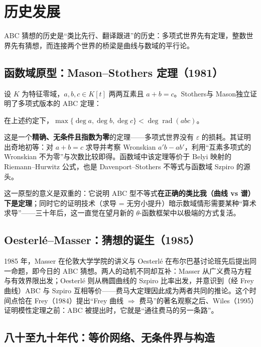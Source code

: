 \section{历史发展}\label{sec:history}

ABC 猜想的历史是“类比先行、翻译跟进”的历史：多项式世界先有定理，整数世界先有猜想，而连接两个世界的桥梁是曲线与数域的平行论。

\subsection{函数域原型：Mason--Stothers 定理（1981）}

设 $K$ 为特征零域，$a, b, c \in K[t]$ 两两互素且 $a + b = c$。Stothers\cite{stothers1981}与 Mason\cite{mason1984}独立证明了多项式版本的 ABC 定理：

\begin{theorem}\label{thm:mason}
    在上述约定下，$\max\{\deg a, \deg b, \deg c\} < \deg \operatorname{rad}(abc)$。
\end{theorem}

这是一个\textbf{精确、无条件且指数为零}的定理——多项式世界没有 $\varepsilon$ 的损耗。其证明出奇地初等：对 $a + b = c$ 求导并考察 Wronskian $a'b - ab'$，利用“互素多项式的 Wronskian 不为零”与次数比较即得。函数域中该定理等价于 Belyi 映射的 Riemann--Hurwitz 公式，也是 Davenport--Stothers 不等式与函数域 Szpiro 的源头。

这一原型的意义是双重的：它说明 ABC 型不等式\textbf{在正确的类比我（曲线 vs 谱）下是定理}；同时它的证明技术（求导 = 无穷小提升）暗示数域情形需要某种“算术求导”——三十年后，这一直觉在望月新的 $\theta$-函数框架中以极端的方式复活。

\subsection{Oesterl\'e--Masser：猜想的诞生（1985）}

1985 年，Masser 在伦敦大学学院的讲义\cite{masser1985}与 Oesterl\'e 在布尔巴基讨论班\cite{oesterle1988}先后提出同一命题，即今日的 ABC 猜想。两人的动机不同却互补：Masser 从广义费马方程与有效界限出发；Oesterl\'e 则从椭圆曲线的 Szpiro 比率出发，并意识到（经 Frey 曲线）ABC 与 Szpiro 互相等价——费马大定理因此成为两者共同的推论。这个时间点恰在 Frey（1984）提出“Frey 曲线 $\Rightarrow$ 费马”的著名观察之后、Wiles（1995）证明模性定理之前：ABC 被提出时，它就是“通往费马的另一条路”。

\subsection{八十至九十年代：等价网络、无条件界与构造}

